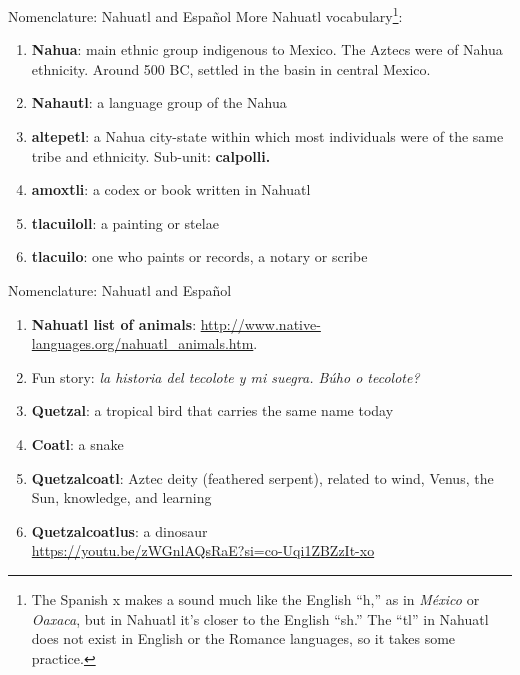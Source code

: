 \documentclass{beamer}
\begin{document}
\begin{frame}{Nomenclature: Nahuatl and Espa\~{n}ol}
\small
More Nahuatl vocabulary\footnote{The Spanish x makes a sound much like the English ``h,'' as in \textit{M\'{e}xico} or \textit{Oaxaca}, but in Nahuatl it's closer to the English ``sh.''  The ``tl'' in Nahuatl does not exist in English or the Romance languages, so it takes some practice.}:
\begin{enumerate}
\item \textbf{Nahua}: main ethnic group indigenous to Mexico.  The Aztecs were of Nahua ethnicity.  Around 500 BC, settled in the basin in central Mexico.
\item \textbf{Nahautl}: a language group of the Nahua
\item \textbf{altepetl}: a Nahua city-state within which most individuals were of the same tribe and ethnicity.  Sub-unit: \textbf{calpolli.}
\item \textbf{amoxtli}: a codex or book written in Nahuatl
\item \textbf{tlacuiloll}: a painting or stelae
\item \textbf{tlacuilo}: one who paints or records, a notary or scribe
\end{enumerate}
\vspace{0.5cm}
\end{frame}

\begin{frame}{Nomenclature: Nahuatl and Espa\~{n}ol}
\small
\begin{enumerate}
\small
\item \textbf{Nahuatl list of animals}: \footnotesize \url{http://www.native-languages.org/nahuatl_animals.htm}.
\small
\item Fun story: \textit{la historia del tecolote y mi suegra.  B\'{u}ho o tecolote?}
\item \textbf{Quetzal}: a tropical bird that carries the same name today
\item \textbf{Coatl}: a snake
\item \textbf{Quetzalcoatl}: Aztec deity (feathered serpent), related to wind, Venus, the Sun, knowledge, and learning
\item \textbf{Quetzalcoatlus}: a dinosaur \\ \footnotesize \url{https://youtu.be/zWGnlAQsRaE?si=co-Uqi1ZBZzIt-xo}
\end{enumerate}
\end{frame}
\end{document}
